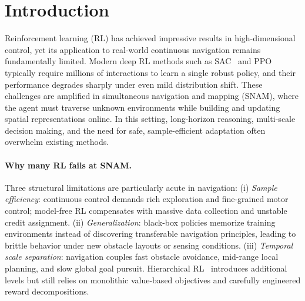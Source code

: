 \section{Introduction}
\label{sec:intro}

Reinforcement learning (RL) has achieved impressive results in high-dimensional control, yet its application to real-world continuous navigation remains fundamentally limited. Modern deep RL methods such as SAC~\citep{haarnoja2018sac} and PPO~\citep{schulman2017ppo} typically require millions of interactions to learn a single robust policy, and their performance degrades sharply under even mild distribution shift. These challenges are amplified in simultaneous navigation and mapping (SNAM), where the agent must traverse unknown environments while building and updating spatial representations online. In this setting, long-horizon reasoning, multi-scale decision making, and the need for safe, sample-efficient adaptation often overwhelm existing methods.

\paragraph{Why many RL fails at SNAM.}
Three structural limitations are particularly acute in navigation:
(i) \emph{Sample efficiency}: continuous control demands rich exploration and fine-grained motor control; model-free RL compensates with massive data collection and unstable credit assignment.
(ii) \emph{Generalization}: black-box policies memorize training environments instead of discovering transferable navigation principles, leading to brittle behavior under new obstacle layouts or sensing conditions.
(iii) \emph{Temporal scale separation}: navigation couples fast obstacle avoidance, mid-range local planning, and slow global goal pursuit. Hierarchical RL~\citep{sutton1998between,vezhnevets2017feudal} introduces additional levels but still relies on monolithic value-based objectives and carefully engineered reward decompositions.

